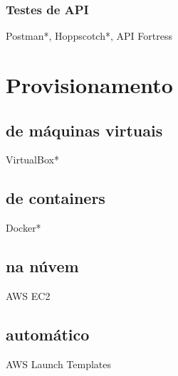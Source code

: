 \subsubsection{Testes de API}\label{ferramentas-testes-apis}
Postman*, Hoppscotch*, API Fortress


\section{Provisionamento}

\subsection{de máquinas virtuais}
VirtualBox*

\subsection{de containers}
Docker*

\subsection{na núvem}
AWS EC2

\subsection{automático}
AWS Launch Templates





